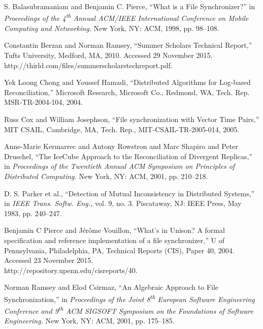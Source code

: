 
S. Balasubramaniam and Benjamin C. Pierce,
``What is a File Synchronizer?''
in \emph{Proceedings of the 4\textsuperscript{th} Annual 
ACM/IEEE International Conference on Mobile Computing and Networking.}
New York, NY: ACM, 1998, pp. 98--108.

Constantin Berzan and Norman Ramsey,
``Summer Scholars Technical Report,''
Tufts University, Medford, MA, 2010.
Accessed 29 November 2015.
http://thirld.com/files/summerscholars\undersc techreport.pdf.

Yek Loong Chong and Youssef Hamadi,
``Distributed Algorithms for Log-based Reconciliation,''
Microsoft Research, Microsoft Co., Redmond, WA,
Tech. Rep. MSR-TR-2004-104, 2004.

Russ Cox and William Josephson,
``File synchronization with Vector Time Pairs,''
MIT CSAIL, Cambridge, MA, 
Tech. Rep., MIT-CSAIL-TR-2005-014, 2005.

Anne-Marie Kermarrec and Antony Rowstron and Marc Shapiro and Peter Druschel,
``The IceCube Approach to the Reconciliation of Divergent Replicas,''
in \emph{Proceedings of the Twentieth Annual ACM Symposium on Principles of Distributed Computing.}
New York, NY: ACM, 2001, pp. 210--218.

D. S. Parker et al.,
``Detection of Mutual Inconsistency in Distributed Systems,''
in \emph{IEEE Trans. Softw. Eng.,}
vol. 9, no. 3.
Piscataway, NJ: IEEE Press,
May 1983,
pp. 240--247.

Benjamin C Pierce and J{\'e}r{\^o}me Vouillon,
``What's in Unison? A formal specification and reference implementation of a file synchronizer,''
U of Pennsylvania,
Philadelphia, PA,
Technical Reports (CIS),
Paper 40,
2004.
Accessed 23 November 2015.\\
http://repository.upenn.edu/cis\undersc reports/40.

Norman Ramsey and Elod Csirmaz,
``An Algebraic Approach to File Synchronization,''
in \emph{Proceedings of the Joint 8\textsuperscript{th} European Software Engineering Conference 
and 9\textsuperscript{th} ACM SIGSOFT Symposium on the Foundations of Software Engineering.}
New York, NY: ACM, 2001, pp. 175--185.

